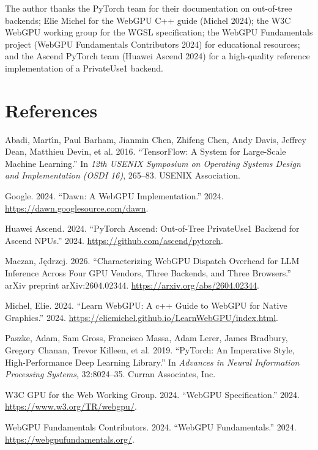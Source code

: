 The author thanks the PyTorch team for their documentation on
out-of-tree backends; Elie Michel for the WebGPU C++ guide (Michel
2024); the W3C WebGPU working group for the WGSL specification; the
WebGPU Fundamentals project (WebGPU Fundamentals Contributors 2024) for
educational resources; and the Ascend PyTorch team (Huawei Ascend 2024)
for a high-quality reference implementation of a PrivateUse1 backend.

\section*{References}\label{references}

\label{refs}
\begin{CSLReferences}{1}{0}
Abadi, Martı́n, Paul Barham, Jianmin Chen, Zhifeng Chen, Andy Davis,
Jeffrey Dean, Matthieu Devin, et al. 2016. {``{TensorFlow}: A System for
{Large-Scale} Machine Learning.''} In \emph{12th USENIX Symposium on
Operating Systems Design and Implementation (OSDI 16)}, 265--83. USENIX
Association.

Google. 2024. {``Dawn: A WebGPU Implementation.''} 2024.
\url{https://dawn.googlesource.com/dawn}.

Huawei Ascend. 2024. {``PyTorch Ascend: Out-of-Tree PrivateUse1 Backend
for Ascend NPUs.''} 2024. \url{https://github.com/ascend/pytorch}.

Maczan, Jędrzej. 2026. {``Characterizing {WebGPU} Dispatch Overhead for
{LLM} Inference Across Four {GPU} Vendors, Three Backends, and Three
Browsers.''} arXiv preprint arXiv:2604.02344.
\url{https://arxiv.org/abs/2604.02344}.

Michel, Elie. 2024. {``Learn WebGPU: A c++ Guide to WebGPU for Native
Graphics.''} 2024.
\url{https://eliemichel.github.io/LearnWebGPU/index.html}.

Paszke, Adam, Sam Gross, Francisco Massa, Adam Lerer, James Bradbury,
Gregory Chanan, Trevor Killeen, et al. 2019. {``PyTorch: An Imperative
Style, High-Performance Deep Learning Library.''} In \emph{Advances in
Neural Information Processing Systems}, 32:8024--35. Curran Associates,
Inc.

W3C GPU for the Web Working Group. 2024. {``WebGPU Specification.''}
2024. \url{https://www.w3.org/TR/webgpu/}.

WebGPU Fundamentals Contributors. 2024. {``WebGPU Fundamentals.''} 2024.
\url{https://webgpufundamentals.org/}.

\end{CSLReferences}
